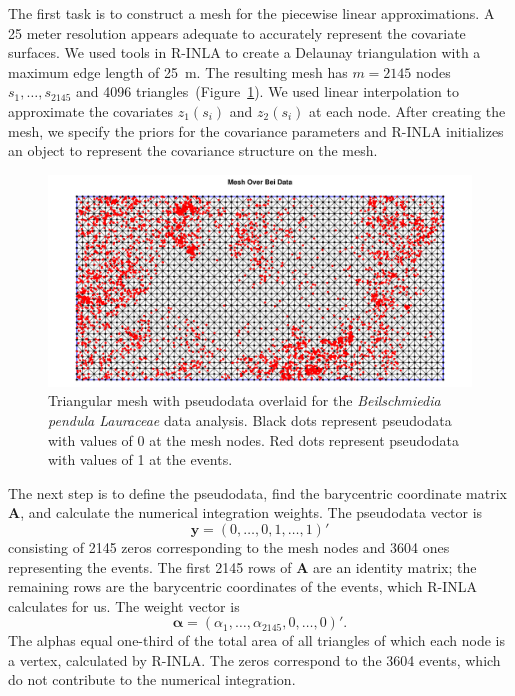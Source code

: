 \documentclass[]{interact}
\begin{document}
The first task is to construct a mesh for the piecewise linear approximations.
A 25 meter resolution appears adequate to accurately represent the covariate
surfaces. We used tools in R-INLA to create a Delaunay
triangulation with a maximum edge length of 25~m. The resulting mesh has
\(m = 2145\) nodes \(s_{1},  \dots, s_{2145}\) and 4096
triangles~(Figure~\ref{beimesh}). We used linear interpolation to approximate
the covariates \(z_{1}(s_{i})\) and \(z_{2}(s_{i})\) at each node. After
creating the mesh, we specify the priors for the covariance parameters and
R-INLA initializes an object to represent the covariance structure
on the mesh.

\begin{figure}[t]
\centering
\includegraphics[width=.7\textwidth]{figures/bei_mesh.pdf}
\caption{Triangular mesh with pseudodata overlaid for the \emph{Beilschmiedia
pendula Lauraceae} data analysis. Black dots represent pseudodata with values
of 0 at the mesh nodes. Red dots represent pseudodata with values of 1 at the
events.}
\label{beimesh}
\end{figure}

The next step is to define the pseudodata, find the barycentric coordinate
matrix \(\mathbf{A}\), and calculate the numerical integration weights. The
pseudodata vector is
\begin{equation}
\mathbf{y} = (0, \dots, 0, 1, \dots, 1)'
\end{equation}
consisting of 2145 zeros corresponding to the mesh nodes and 3604 ones
representing the events. The first 2145 rows of \(\mathbf{A}\) are an
identity matrix; the remaining rows are the barycentric coordinates of the
events, which R-INLA calculates for us. The weight vector is
\begin{equation}
\boldsymbol{\alpha} = (\alpha_{1}, \dots, \alpha_{2145}, 0, \dots, 0)'.
\end{equation}
The alphas equal one-third of the total area of all triangles of which each
node is a vertex, calculated by R-INLA. The zeros correspond to the
3604 events, which do not contribute to the numerical integration.
\end{document}
